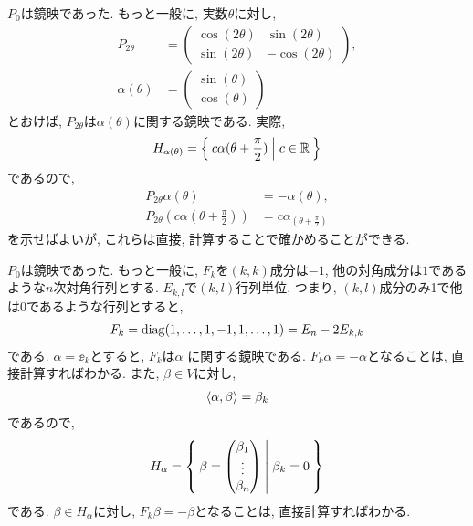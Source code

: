 \begin{example}
  \label{ex:i2m:ref}
  $P_0$は鏡映であった.
  もっと一般に,
  実数$\theta$に対し,
\begin{align*}
  P_{2\theta}&=
  \begin{pmatrix}
    \cos(2\theta) & \sin(2\theta) \\
    \sin(2\theta) & -\cos(2\theta) 
  \end{pmatrix},\\
  \alpha(\theta)
  &=
  \begin{pmatrix}
    \sin(\theta) \\
    \cos(\theta) 
  \end{pmatrix}
\end{align*}
とおけば, $P_{2\theta}$は$\alpha(\theta)$に関する鏡映である.
実際,
\begin{align*}
  H_{\alpha(\theta)} = \Set{c \alpha(\theta+\frac{\pi}{2})|c\in \mathbb{R}} 
\end{align*}
であるので,
\begin{align*}
  P_{2\theta}\alpha(\theta) &= - \alpha(\theta),\\
  P_{2\theta}(c\alpha(\theta+\frac{\pi}{2})) &= c\alpha_(\theta+\frac{\pi}{2})
\end{align*}
を示せばよいが, これらは直接, 計算することで確かめることができる.
\end{example}


\begin{example}
  \label{ex:a1n:refl}
  $P_0$は鏡映であった.
  もっと一般に,
  $F_k$を$(k,k)$成分は$-1$, 他の対角成分は$1$であるような$n$次対角行列とする.
 $E_{k,l}$で$(k,l)$行列単位, つまり, $(k,l)$成分のみ1で他は0であるような行列とすると,
  \begin{align*}
    F_k = \operatorname{diag}(1,\ldots,1,-1,1,\ldots,1)=E_n-2E_{k,k}
  \end{align*}
  である.
  $\alpha=\ee_k$とすると, $F_k$は$\alpha$ に関する鏡映である.
  $F_k \alpha = -\alpha$となることは, 直接計算すればわかる.
  また, $\beta\in V$に対し,
  \begin{align*}
    \Braket{\alpha,\beta}= \beta_k 
  \end{align*}
  であるので,
  \begin{align*}
    H_\alpha = \Set{
      \beta=
      \begin{pmatrix}
        \beta_1\\
        \vdots\\
        \beta_n
      \end{pmatrix}
      | \beta_k=0}
  \end{align*}
  である.  $\beta\in H_\alpha$に対し, 
  $F_k \beta = -\beta$となることは, 直接計算すればわかる.
\end{example}

